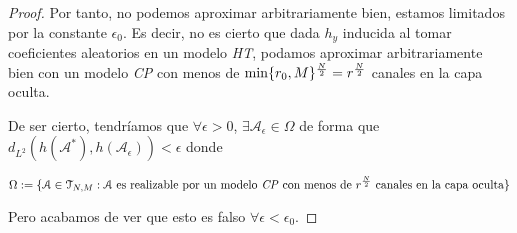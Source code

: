 \begin{proof}
    Por tanto, no podemos aproximar arbitrariamente bien, estamos limitados por la constante $\epsilon_0$. Es decir, no es cierto que dada $h_y$ inducida al tomar coeficientes aleatorios en un modelo \textit{HT}, podamos aproximar arbitrariamente bien con un modelo \textit{CP} con menos de $\min \{ r_0, M \}^{\frac{N}{2}} = r^{\frac{N}{2}}$ canales en la capa oculta.

    De ser cierto, tendríamos que $\forall \epsilon > 0$, $\exists \mathcal{A}_\epsilon \in \Omega$ de forma que $d_{L^2}(h(\mathcal{A}^*), h(\mathcal{A}_\epsilon)) < \epsilon$ donde

    \begin{equation}
        \Omega := \{ \mathcal{A} \in \mathcal{T}_{N, M}: \mathcal{A} \text{ es realizable por un modelo \textit{CP} con menos de } r^{\frac{N}{2}} \text{ canales en la capa oculta} \}
    \end{equation}

    Pero acabamos de ver que esto es falso $\forall \epsilon < \epsilon_0$.
\end{proof}
